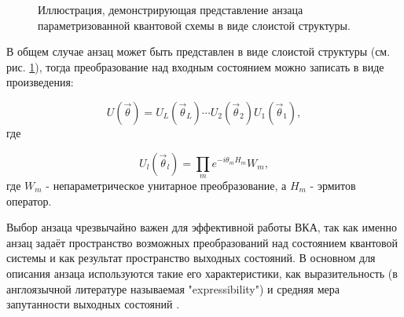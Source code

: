 \documentclass[14pt]{extarticle}
\begin{document}
\begin{figure}[H]
\caption{Иллюстрация, демонстрирующая представление анзаца параметризованной квантовой схемы в виде слоистой структуры.}\label{fig:layers_anzatz}
\end{figure}

\qquad В общем случае анзац может быть представлен в виде слоистой структуры (см. рис. \ref{fig:layers_anzatz}), тогда преобразование над входным состоянием можно записать в виде произведения:

\begin{equation}
U(\vec \theta) = U_{L}(\vec{\theta}_{L}) \cdots U_{2}(\vec{\theta}_{2}) U_{1}(\vec{\theta}_{1}),
\end{equation} где 

\begin{equation}
U_{l}(\vec{\theta}_{l}) = \prod_{m} e^{-i \theta_{m} H_{m} } W_{m},
\end{equation} где $W_{m}$ - непараметрическое унитарное преобразование, а $H_{m}$ - эрмитов оператор.


\qquad Выбор анзаца чрезвычайно важен для эффективной работы ВКА, так как именно анзац задаёт пространство возможных преобразований над состоянием квантовой системы и как результат пространство выходных состояний. В основном для описания анзаца используются такие его характеристики, как выразительность (в англоязычной литературе называемая "expressibility") и средняя мера запутанности выходных состояний \cite{Sim_2019}.
\end{document}
